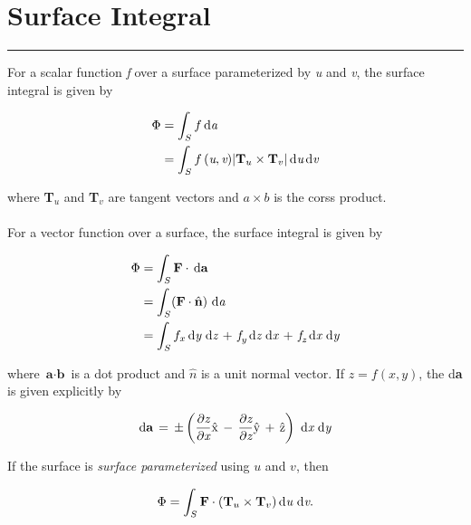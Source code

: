 \documentclass[fleqn,10pt,titlepage]{article}
\numberwithin{equation}{section}
\begin{document}
\section*{Surface Integral}
\hrule
For a scalar function \textit{f} over a surface parameterized by \textit{u} and \textit{v}, the surface integral is given by

\begin{align}
    \Phi& = \int_{S} f \, \rm{d}\textit{a}\\
    & = \int_{S} f \,(\textit{u}, \textit{v}) |\textbf{T}_u \times \textbf{T}_v |\, \rm{d}\textit{u} \, \rm{d}\textit{v}
\end{align}

where \textbf{T}$_u$ and \textbf{T}$_v$ are tangent vectors and $a \times b$ is the corss product.\\ \\
For a vector function over a surface, the surface integral is given by

\begin{align}
    \Phi & = \int_{S} \textbf{F} \cdot \, \rm{d} \textbf{a} \\ 
    & = \int_{S}(\textbf{F} \cdot \hat{\textbf{n}})\,\, \rm{d} \textit{a} \\
    & = \int_{S} f_x \,\rm{d}\textit{y} \,\, \rm{d}\textit{z} \, + \, \textit{f}_\textit{y} \, \rm{d}\textit{z} \,\, 
    \rm{d}\textit{x} \, + \, \textit{f}_\textit{z} \, \rm{d}\textit{x} \,\, \rm{d}\textit{y}
\end{align}

where $\textbf{a} \cdot \textbf{b}$ is a dot product and $\hat{n}$ is a unit normal vector. If $z = f(x, y)$,
 the d\textbf{a} is given explicitly by

\begin{align}
    \rm{d}\textbf{a} \, = \, \pm \left(\frac{\partial\textit{z}}{\partial\textit{x}}\hat{x} \, - \, 
    \frac{\partial\textit{z}}{\partial\textit{z}}\hat{y}\, + \, \hat{z}\right) \, \, 
    \rm{d}\textit{x} \, \, \rm{d}\textit{y}
\end{align}

If the surface is \textit{surface parameterized} using $u$ and $v$, then

\begin{align}
    \Phi = \int_{S} \textbf{F} \cdot (\textbf{T}_u \times \textbf{T}_v )\, \rm{d}\textit{u} \, \, \rm{d}\textit{v}.
\end{align}

\clearpage

\setcounter{section}{2}
\setcounter{equation}{0}
\end{document}
